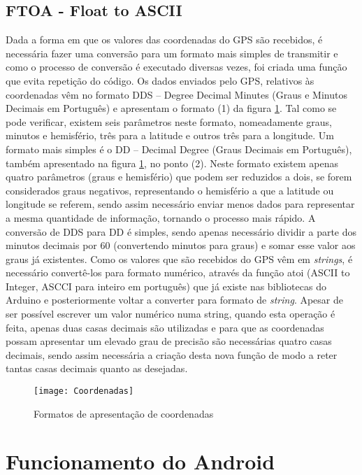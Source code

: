 \subsection{FTOA - Float to ASCII}
\label{sub:FTOA}

Dada a forma em que os valores das coordenadas do GPS são recebidos, é necessária fazer uma conversão para um formato mais simples de transmitir e como o processo de conversão é executado diversas vezes, foi criada uma função que evita repetição do código.
Os dados enviados pelo GPS, relativos às coordenadas vêm no formato DDS – Degree Decimal Minutes (Graus e Minutos Decimais em Português) e apresentam o formato (1) da figura \ref{fig:formatos_de_apresentacao_de_coordenadas}.
Tal como se pode verificar, existem seis parâmetros neste formato, nomeadamente graus, minutos  e hemisfério, três para a latitude e outros três para a longitude. 
Um formato mais simples é o DD – Decimal Degree (Graus Decimais em Português), também apresentado na figura \ref{fig:formatos_de_apresentacao_de_coordenadas}, no ponto (2).
Neste formato existem apenas quatro parâmetros (graus e hemisfério) que podem ser reduzidos a dois, se forem considerados graus negativos, representando o hemisfério a que a latitude ou longitude se referem, sendo assim necessário enviar menos dados para representar a mesma quantidade de informação, tornando o processo mais rápido.
A conversão de DDS para DD é simples, sendo apenas necessário dividir a parte dos minutos decimais por 60 (convertendo minutos para graus) e somar esse valor aos graus já existentes.
Como os valores que são recebidos do GPS vêm em \emph{strings}, é necessário convertê-los para formato numérico, através da função atoi (ASCII to Integer, ASCCI para inteiro em português) que já existe nas bibliotecas do Arduino e posteriormente voltar a converter para formato de \emph{string}.
Apesar de ser possível escrever um valor numérico numa string, quando esta operação é feita, apenas duas casas decimais são utilizadas e para que as coordenadas possam apresentar um elevado grau de precisão são necessárias quatro casas decimais, sendo assim necessária a criação desta nova função de modo a reter tantas casas decimais quanto as desejadas.

\begin{figure}[!htbp]
	\centering
	\texttt{[image: Coordenadas]}
	\caption{Formatos de apresentação de coordenadas}
	\label{fig:formatos_de_apresentacao_de_coordenadas}
\end{figure}

\section{Funcionamento do Android}
\label{sec:funcionamento_do_android}

